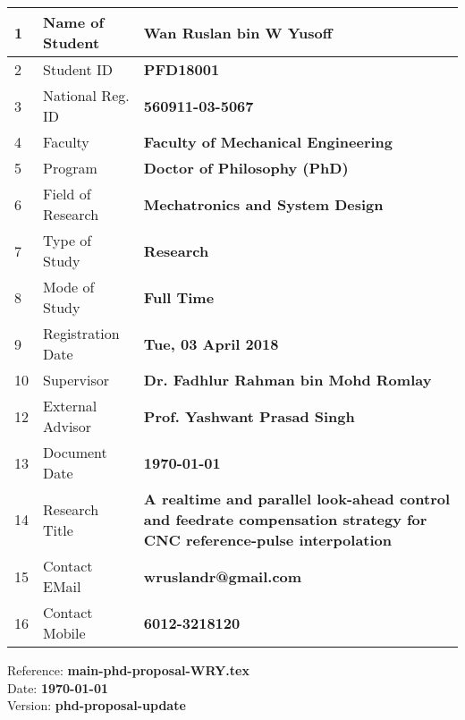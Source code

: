 \begin{titlepage}
\begin{table}[ht]
\begin{center}
\begin{tabular}{ |p{0.5cm}|p{5.4cm}|p{10.0cm}| }
			\hline 1 & Name of Student    & \textbf{Wan Ruslan bin W Yusoff} \\ 
			\hline 2 & Student ID         & \textbf{PFD18001} \\ 
			\hline 3 & National Reg. ID   & \textbf{560911-03-5067} \\ 
			\hline 4 & Faculty            & \textbf{Faculty of Mechanical Engineering} \\ 
			\hline 5 & Program            & \textbf{Doctor of Philosophy (PhD)} \\ 
			\hline 6 & Field of Research  & \textbf{Mechatronics and System Design} \\ 
			\hline 7 & Type of Study      & \textbf{Research}\\ 
			\hline 8 & Mode of Study      & \textbf{Full Time} \\ 
			\hline 9 & Registration Date  & \textbf{Tue, 03 April 2018} \\ 
			\hline 10 & Supervisor         & \textbf{Dr. Fadhlur Rahman bin Mohd Romlay} \\ 
			\hline 12 & External Advisor  & \textbf{Prof. Yashwant Prasad Singh} \\ 
			\hline 13 & Document Date     & \textbf{\today} \\ 
			\hline 14 & Research Title    & \textbf{A realtime and parallel look-ahead control and feedrate compensation strategy for CNC reference-pulse
				 interpolation} \\ 
			\hline 15 & Contact EMail     & \textbf{wruslandr@gmail.com} \\
			\hline 16 & Contact Mobile    & \textbf{6012-3218120} \\
			\hline
		\end{tabular}
		\label{table:PhD Program Registration Details}
	\end{center}
\end{table}  


\vspace{1.0cm}
\begin{flushleft}
{\normalsize	
Reference: \textbf{main-phd-proposal-WRY.tex}\\
Date: \textbf{\today} \\
Version: \textbf{phd-proposal-update}\\
}

\end{flushleft} 
\end{titlepage}
